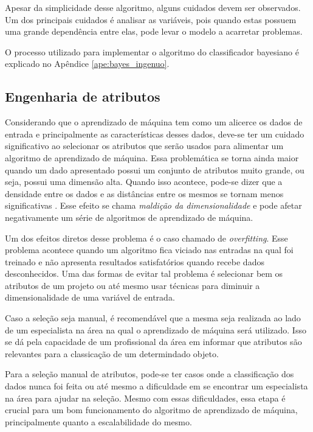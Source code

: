 Apesar da simplicidade desse algoritmo, alguns cuidados devem ser observados.
Um dos principais cuidados é analisar as variáveis, pois quando estas possuem uma grande
dependência entre elas, pode levar o modelo a acarretar problemas.

O processo utilizado para implementar o algoritmo do classificador
bayesiano é explicado no Apêndice \ref{ape:bayes_ingenuo}.

\subsection{Engenharia de atributos}

Considerando que o aprendizado de máquina tem como um alicerce os dados de entrada
e principalmente as características desses dados, deve-se ter um cuidado
significativo ao selecionar os atributos que serão usados para alimentar um
algoritmo de aprendizado de máquina. Essa problemática se torna ainda maior
quando um dado apresentado possui um conjunto de atributos muito grande, ou
seja, possui uma dimensão alta. Quando isso acontece, pode-se dizer que a
densidade entre os dados e as distâncias entre os mesmos se tornam menos
significativas \cite{amatriain2011data}. Esse efeito se chama \textit{maldição
da dimensionalidade} e pode afetar negativamente um série de algoritmos de
aprendizado de máquina.

Um dos efeitos diretos desse problema é o caso chamado de \textit{overfitting}.
Esse problema acontece quando um algoritmo fica viciado nas entradas na qual foi
treinado e não apresenta resultados satisfatórios quando recebe dados desconhecidos.
Uma das formas de evitar tal problema é selecionar bem os atributos
de um projeto ou até mesmo usar técnicas para diminuir a dimensionalidade de uma
variável de entrada.

Caso a seleção seja manual, é recomendável que a mesma seja realizada ao lado de
um especialista na área na qual o aprendizado de máquina será utilizado. Isso se
dá pela capacidade de um profissional da área em informar que atributos são
relevantes para a classicação de um determindado objeto.

Para a seleção manual de atributos, pode-se ter
casos onde a classificação dos dados nunca foi feita ou até mesmo a dificuldade
em se encontrar um especialista na área para ajudar na seleção. Mesmo com
essas dificuldades, essa etapa é crucial para um bom funcionamento do algoritmo
de aprendizado de máquina, principalmente quanto a escalabilidade do mesmo.


